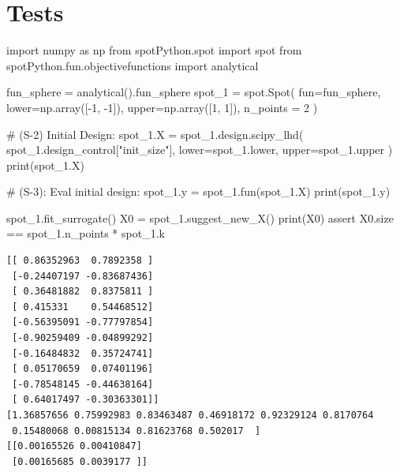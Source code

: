 \documentclass[
  letterpaper,
  DIV=11,
  numbers=noendperiod]{scrreprt}
\newenvironment{Shaded}{\begin{snugshade}}{\end{snugshade}}
\newcommand{\BuiltInTok}[1]{\textcolor[rgb]{0.00,0.23,0.31}{#1}}
\newcommand{\CommentTok}[1]{\textcolor[rgb]{0.37,0.37,0.37}{#1}}
\newcommand{\ControlFlowTok}[1]{\textcolor[rgb]{0.00,0.23,0.31}{#1}}
\newcommand{\DecValTok}[1]{\textcolor[rgb]{0.68,0.00,0.00}{#1}}
\newcommand{\ImportTok}[1]{\textcolor[rgb]{0.00,0.46,0.62}{#1}}
\newcommand{\NormalTok}[1]{\textcolor[rgb]{0.00,0.23,0.31}{#1}}
\newcommand{\OperatorTok}[1]{\textcolor[rgb]{0.37,0.37,0.37}{#1}}
\newcommand{\StringTok}[1]{\textcolor[rgb]{0.13,0.47,0.30}{#1}}
\begin{document}
\hypertarget{tests}{%
\section{Tests}\label{tests}}

\begin{Shaded}
\begin{Highlighting}[]
\ImportTok{import}\NormalTok{ numpy }\ImportTok{as}\NormalTok{ np}
\ImportTok{from}\NormalTok{ spotPython.spot }\ImportTok{import}\NormalTok{ spot}
\ImportTok{from}\NormalTok{ spotPython.fun.objectivefunctions }\ImportTok{import}\NormalTok{ analytical}

\NormalTok{fun\_sphere }\OperatorTok{=}\NormalTok{ analytical().fun\_sphere}
\NormalTok{spot\_1 }\OperatorTok{=}\NormalTok{ spot.Spot(}
\NormalTok{    fun}\OperatorTok{=}\NormalTok{fun\_sphere,}
\NormalTok{    lower}\OperatorTok{=}\NormalTok{np.array([}\OperatorTok{{-}}\DecValTok{1}\NormalTok{, }\OperatorTok{{-}}\DecValTok{1}\NormalTok{]),}
\NormalTok{    upper}\OperatorTok{=}\NormalTok{np.array([}\DecValTok{1}\NormalTok{, }\DecValTok{1}\NormalTok{]),}
\NormalTok{    n\_points }\OperatorTok{=} \DecValTok{2}
\NormalTok{)}

\CommentTok{\# (S{-}2) Initial Design:}
\NormalTok{spot\_1.X }\OperatorTok{=}\NormalTok{ spot\_1.design.scipy\_lhd(}
\NormalTok{    spot\_1.design\_control[}\StringTok{"init\_size"}\NormalTok{], lower}\OperatorTok{=}\NormalTok{spot\_1.lower, upper}\OperatorTok{=}\NormalTok{spot\_1.upper}
\NormalTok{)}
\BuiltInTok{print}\NormalTok{(spot\_1.X)}

\CommentTok{\# (S{-}3): Eval initial design:}
\NormalTok{spot\_1.y }\OperatorTok{=}\NormalTok{ spot\_1.fun(spot\_1.X)}
\BuiltInTok{print}\NormalTok{(spot\_1.y)}

\NormalTok{spot\_1.fit\_surrogate()}
\NormalTok{X0 }\OperatorTok{=}\NormalTok{ spot\_1.suggest\_new\_X()}
\BuiltInTok{print}\NormalTok{(X0)}
\ControlFlowTok{assert}\NormalTok{ X0.size }\OperatorTok{==}\NormalTok{ spot\_1.n\_points }\OperatorTok{*}\NormalTok{ spot\_1.k}
\end{Highlighting}
\end{Shaded}

\begin{verbatim}
[[ 0.86352963  0.7892358 ]
 [-0.24407197 -0.83687436]
 [ 0.36481882  0.8375811 ]
 [ 0.415331    0.54468512]
 [-0.56395091 -0.77797854]
 [-0.90259409 -0.04899292]
 [-0.16484832  0.35724741]
 [ 0.05170659  0.07401196]
 [-0.78548145 -0.44638164]
 [ 0.64017497 -0.30363301]]
[1.36857656 0.75992983 0.83463487 0.46918172 0.92329124 0.8170764
 0.15480068 0.00815134 0.81623768 0.502017  ]
[[0.00165526 0.00410847]
 [0.00165685 0.0039177 ]]
\end{verbatim}
\end{document}
